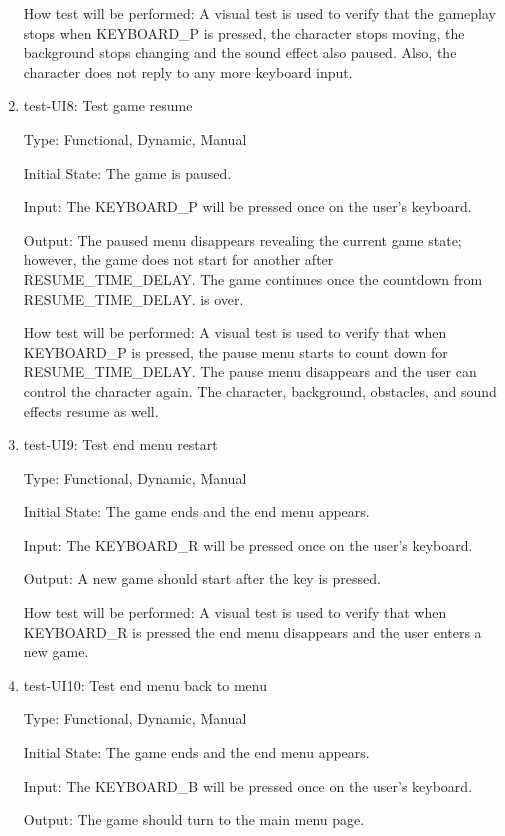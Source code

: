 \documentclass[12pt, titlepage]{article}
\begin{document}
\begin{enumerate}
How test will be performed: A visual test is used to verify that the gameplay stops when KEYBOARD\_P is pressed, the character stops moving, the background stops changing and the sound effect also paused. Also, the character does not reply to any more keyboard input.
				
\item{test-UI8: Test game resume\\}

Type: Functional, Dynamic, Manual
					
Initial State: The game is paused.
					
Input: The KEYBOARD\_P will be pressed once on the user's keyboard.
					
Output: The paused menu disappears revealing the current game state; however, the game does not start for another after RESUME\_TIME\_DELAY. The game continues once the countdown from RESUME\_TIME\_DELAY. is over.
					
How test will be performed: A visual test is used to verify that when KEYBOARD\_P is pressed, the pause menu starts to count down for RESUME\_TIME\_DELAY. The pause menu disappears and the user can control the character again. The character, background, obstacles, and sound effects resume as well.

\item{test-UI9: Test end menu restart\\}

Type: Functional, Dynamic, Manual
					
Initial State: The game ends and the end menu appears.
					
Input: The KEYBOARD\_R will be pressed once on the user's keyboard.
					
Output: A new game should start after the key is pressed.
					
How test will be performed: A visual test is used to verify that when KEYBOARD\_R is pressed the end menu disappears and the user enters a new game.	

\item{test-UI10: Test end menu back to menu\\}

Type: Functional, Dynamic, Manual
					
Initial State: The game ends and the end menu appears.
					
Input: The KEYBOARD\_B will be pressed once on the user's keyboard.
					
Output: The game should turn to the main menu page.
					

\end{enumerate}
\end{document}
